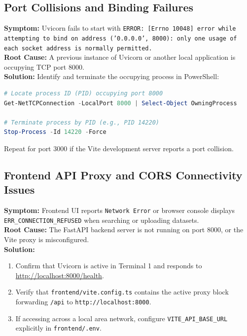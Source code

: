 \subsection{Port Collisions and Binding Failures}
\textbf{Symptom:} Uvicorn fails to start with \texttt{ERROR: [Errno 10048] error while attempting to bind on address ('0.0.0.0', 8000): only one usage of each socket address is normally permitted.}\\
\textbf{Root Cause:} A previous instance of Uvicorn or another local application is occupying TCP port 8000.\\
\textbf{Solution:} Identify and terminate the occupying process in PowerShell:
\begin{lstlisting}[language=powershell]
# Locate process ID (PID) occupying port 8000
Get-NetTCPConnection -LocalPort 8000 | Select-Object OwningProcess

# Terminate process by PID (e.g., PID 14220)
Stop-Process -Id 14220 -Force
\end{lstlisting}
\noindent Repeat for port 3000 if the Vite development server reports a port collision.

\subsection{Frontend API Proxy and CORS Connectivity Issues}
\textbf{Symptom:} Frontend UI reports \texttt{Network Error} or browser console displays \texttt{ERR\_CONNECTION\_REFUSED} when searching or uploading datasets.\\
\textbf{Root Cause:} The FastAPI backend server is not running on port 8000, or the Vite proxy is misconfigured.\\
\textbf{Solution:}
\begin{enumerate}
    \item Confirm that Uvicorn is active in Terminal 1 and responds to \url{http://localhost:8000/health}.
    \item Verify that \texttt{frontend/vite.config.ts} contains the active proxy block forwarding \texttt{/api} to \texttt{http://localhost:8000}.
    \item If accessing across a local area network, configure \texttt{VITE\_API\_BASE_URL} explicitly in \texttt{frontend/.env}.
\end{enumerate}

